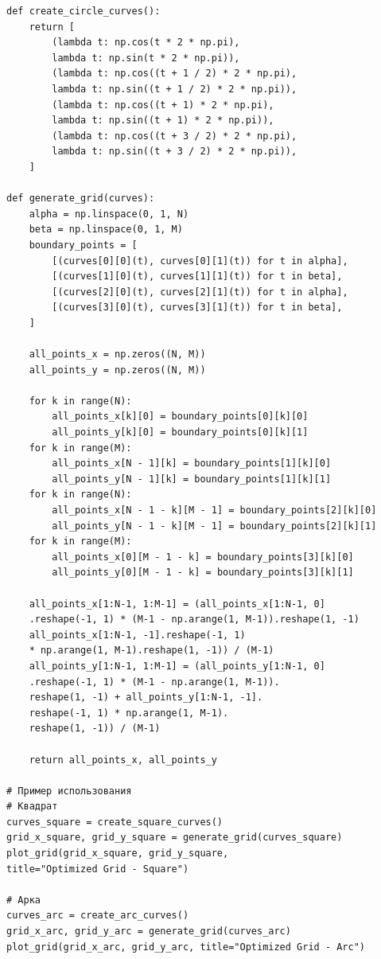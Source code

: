\documentclass[a4paper,14pt,russian]{extreport}
\renewcommand{\_}{\kern-1.5pt\textunderscore\kern-1.5pt}
\begin{document}
\begin{verbatim}
def create_circle_curves():
    return [
        (lambda t: np.cos(t * 2 * np.pi),
        lambda t: np.sin(t * 2 * np.pi)),
        (lambda t: np.cos((t + 1 / 2) * 2 * np.pi),
        lambda t: np.sin((t + 1 / 2) * 2 * np.pi)),
        (lambda t: np.cos((t + 1) * 2 * np.pi),
        lambda t: np.sin((t + 1) * 2 * np.pi)),
        (lambda t: np.cos((t + 3 / 2) * 2 * np.pi),
        lambda t: np.sin((t + 3 / 2) * 2 * np.pi)),
    ]

def generate_grid(curves):
    alpha = np.linspace(0, 1, N)
    beta = np.linspace(0, 1, M)
    boundary_points = [
        [(curves[0][0](t), curves[0][1](t)) for t in alpha],
        [(curves[1][0](t), curves[1][1](t)) for t in beta],
        [(curves[2][0](t), curves[2][1](t)) for t in alpha],
        [(curves[3][0](t), curves[3][1](t)) for t in beta],
    ]

    all_points_x = np.zeros((N, M))
    all_points_y = np.zeros((N, M))

    for k in range(N):
        all_points_x[k][0] = boundary_points[0][k][0]
        all_points_y[k][0] = boundary_points[0][k][1]
    for k in range(M):
        all_points_x[N - 1][k] = boundary_points[1][k][0]
        all_points_y[N - 1][k] = boundary_points[1][k][1]
    for k in range(N):
        all_points_x[N - 1 - k][M - 1] = boundary_points[2][k][0]
        all_points_y[N - 1 - k][M - 1] = boundary_points[2][k][1]
    for k in range(M):
        all_points_x[0][M - 1 - k] = boundary_points[3][k][0]
        all_points_y[0][M - 1 - k] = boundary_points[3][k][1]

    all_points_x[1:N-1, 1:M-1] = (all_points_x[1:N-1, 0]
    .reshape(-1, 1) * (M-1 - np.arange(1, M-1)).reshape(1, -1) 
    all_points_x[1:N-1, -1].reshape(-1, 1)
    * np.arange(1, M-1).reshape(1, -1)) / (M-1)
    all_points_y[1:N-1, 1:M-1] = (all_points_y[1:N-1, 0]
    .reshape(-1, 1) * (M-1 - np.arange(1, M-1)).
    reshape(1, -1) + all_points_y[1:N-1, -1].
    reshape(-1, 1) * np.arange(1, M-1).
    reshape(1, -1)) / (M-1)

    return all_points_x, all_points_y

# Пример использования
# Квадрат
curves_square = create_square_curves()
grid_x_square, grid_y_square = generate_grid(curves_square)
plot_grid(grid_x_square, grid_y_square,
title="Optimized Grid - Square")

# Арка
curves_arc = create_arc_curves()
grid_x_arc, grid_y_arc = generate_grid(curves_arc)
plot_grid(grid_x_arc, grid_y_arc, title="Optimized Grid - Arc")


\end{verbatim}
\end{document}
